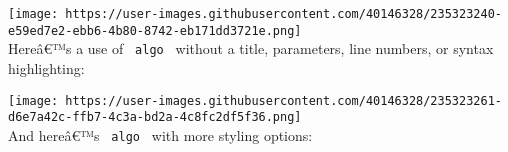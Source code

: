 \texttt{[image: https://user-images.githubusercontent.com/40146328/235323240-e59ed7e2-ebb6-4b80-8742-eb171dd3721e.png]}\\

Hereâ€™s a use of \texttt{\ algo\ } without a title, parameters, line
numbers, or syntax highlighting:

\begin{Shaded}
\begin{Highlighting}[]
\NormalTok{)[}
\NormalTok{  \textbackslash{}}
\NormalTok{    \textbackslash{}}
\NormalTok{]}
\end{Highlighting}
\end{Shaded}

\texttt{[image: https://user-images.githubusercontent.com/40146328/235323261-d6e7a42c-ffb7-4c3a-bd2a-4c8fc2df5f36.png]}\\

And hereâ€™s \texttt{\ algo\ } with more styling options:

